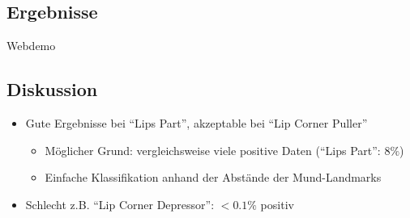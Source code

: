 \documentclass{beamer}
\begin{document}
\subsection{Ergebnisse}
\begin{frame}[c]
  \begin{center}
    \Huge Webdemo
  \end{center}
\end{frame}


\subsection{Diskussion}
\begin{frame}
  \begin{itemize}
    \item Gute Ergebnisse bei ``Lips Part'', akzeptable bei ``Lip Corner Puller''
      \begin{itemize}
        \item Möglicher Grund: vergleichsweise viele positive Daten (``Lips
          Part'': $8\%$)
        \item Einfache Klassifikation anhand der Abstände der Mund-Landmarks
      \end{itemize}
    \item Schlecht z.B. ``Lip Corner Depressor'': $<0.1\%$ positiv
  \end{itemize}
\end{frame}
\end{document}
